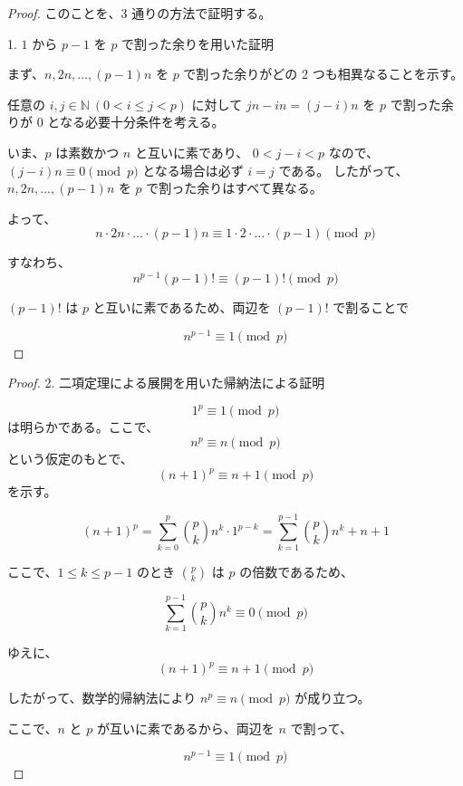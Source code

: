 \begin{proof}
このことを、3 通りの方法で証明する。

1. $1$ から $p-1$ を $p$ で割った余りを用いた証明

まず、$n, 2n, \ldots, (p-1)n$ を $p$ で割った余りがどの 2 つも相異なることを示す。

任意の $i, j \in \mathbb{N}\ (0 < i \leq j < p)$ に対して $jn - in = (j - i)n$ を $p$ で割った余りが $0$ となる必要十分条件を考える。

いま、$p$ は素数かつ $n$ と互いに素であり、 $0 < j - i < p$ なので、
$(j - i)n \equiv 0 \pmod{p}$ となる場合は必ず $i = j$ である。
したがって、$n, 2n, \ldots, (p-1)n$ を $p$ で割った余りはすべて異なる。

よって、
\[
n \cdot 2n \cdot \ldots \cdot (p-1)n \equiv 1 \cdot 2 \cdot \ldots \cdot (p-1) \pmod{p}
\]

すなわち、
\[
n^{p-1}(p-1)! \equiv (p-1)! \pmod{p}
\]

$(p-1)!$ は $p$ と互いに素であるため、両辺を $(p-1)!$ で割ることで

\[
n^{p-1} \equiv 1 \pmod{p}
\]

\end{proof}
\begin{proof}

2. 二項定理による展開を用いた帰納法による証明

\[
1^p \equiv 1 \pmod{p}
\]
は明らかである。ここで、
\[
n^p \equiv n \pmod{p}
\]
という仮定のもとで、
\[
(n+1)^p \equiv n+1 \pmod{p}
\]
を示す。

\[
(n+1)^p = \sum_{k=0}^p \binom{p}{k} n^k \cdot 1^{p-k} = \sum_{k=1}^{p-1} \binom{p}{k} n^k + n + 1
\]

ここで、$1 \leq k \leq p-1$ のとき $\binom{p}{k}$ は $p$ の倍数であるため、

\[
\sum_{k=1}^{p-1} \binom{p}{k} n^k \equiv 0 \pmod{p}
\]

ゆえに、
\[
(n+1)^p \equiv n + 1 \pmod{p}
\]

したがって、数学的帰納法により $n^p \equiv n \pmod{p}$ が成り立つ。

ここで、$n$ と $p$ が互いに素であるから、両辺を $n$ で割って、

\[
n^{p-1} \equiv 1 \pmod{p}
\]

\end{proof}
